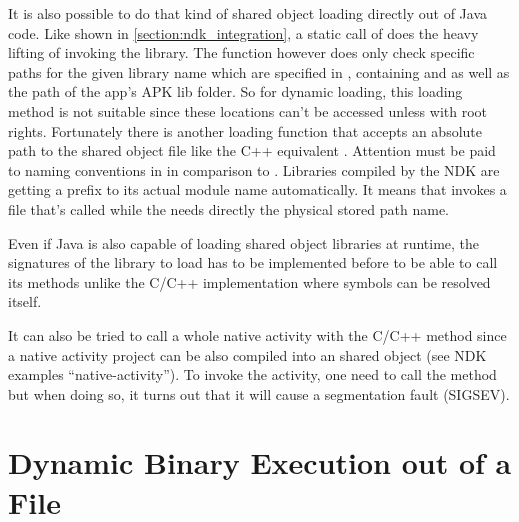 It is also possible to do that kind of shared object loading directly out of Java
code. Like shown in \autoref{section:ndk_integration}, a static call of
 does the heavy lifting of invoking the library.
The  function however does only check specific paths for the given
library name which are specified in , containing
 and  as well as the path of the app's APK lib
folder. So for dynamic loading, this loading method is not suitable since these
locations can't be accessed unless with root rights. Fortunately there is another
loading function  that accepts an absolute path to
the shared object file like the C++ equivalent . Attention must be
paid to naming conventions in  in comparison to .
Libraries compiled by the NDK are getting a  prefix to its actual module
name automatically. It means that  invokes a file
that's called  while the  needs directly the physical
stored path name.

Even if Java is also capable of loading shared object libraries at runtime, the
signatures of the library to load has to be implemented before to be able to call
its methods unlike the C/C++ implementation where symbols can be resolved itself.

It can also be tried to call a whole native activity with the C/C++ method since
a native activity project can be also compiled into an shared object (see NDK
examples ``native-activity''). To invoke the activity, one need to call the
 method but when doing so, it turns out that it will cause
a segmentation fault (SIGSEV).


\section{Dynamic Binary Execution out of a File}\label{section:dyn_bin_exec}

